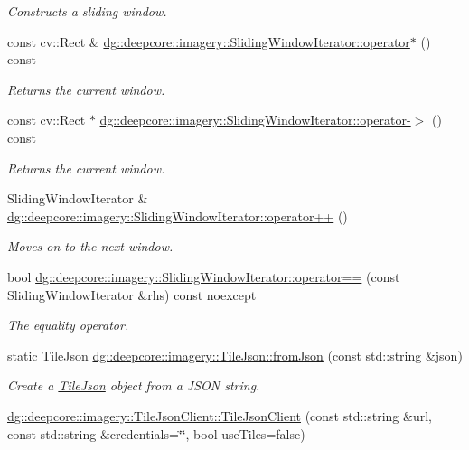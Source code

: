\begin{DoxyCompactItemize}
\begin{DoxyCompactList}\small\item\em Constructs a sliding window. \end{DoxyCompactList}\item 
const cv\+::\+Rect \& \hyperlink{group___imagery_module_gac4ebab49e1019b197708fa07ddf8a550}{dg\+::deepcore\+::imagery\+::\+Sliding\+Window\+Iterator\+::operator$\ast$} () const 
\begin{DoxyCompactList}\small\item\em Returns the current window. \end{DoxyCompactList}\item 
const cv\+::\+Rect $\ast$ \hyperlink{group___imagery_module_ga72f982e7452565b8b39edcfd3e81e2b8}{dg\+::deepcore\+::imagery\+::\+Sliding\+Window\+Iterator\+::operator-\/$>$} () const 
\begin{DoxyCompactList}\small\item\em Returns the current window. \end{DoxyCompactList}\item 
Sliding\+Window\+Iterator \& \hyperlink{group___imagery_module_ga7b899de397aefb4987bcb989f3cb33d4}{dg\+::deepcore\+::imagery\+::\+Sliding\+Window\+Iterator\+::operator++} ()
\begin{DoxyCompactList}\small\item\em Moves on to the next window. \end{DoxyCompactList}\item 
bool \hyperlink{group___imagery_module_gaf2d1d266e7176885e054f28bbdec7c61}{dg\+::deepcore\+::imagery\+::\+Sliding\+Window\+Iterator\+::operator==} (const Sliding\+Window\+Iterator \&rhs) const noexcept
\begin{DoxyCompactList}\small\item\em The equality operator. \end{DoxyCompactList}\item 
static Tile\+Json \hyperlink{group___imagery_module_ga00a8cf6ff58f7d1e46ab5d710efe8e79}{dg\+::deepcore\+::imagery\+::\+Tile\+Json\+::from\+Json} (const std\+::string \&json)
\begin{DoxyCompactList}\small\item\em Create a \hyperlink{structdg_1_1deepcore_1_1imagery_1_1_tile_json}{Tile\+Json} object from a J\+S\+ON string. \end{DoxyCompactList}\item 
\hyperlink{group___imagery_module_ga3a03a27c401542c408a982382e611056}{dg\+::deepcore\+::imagery\+::\+Tile\+Json\+Client\+::\+Tile\+Json\+Client} (const std\+::string \&url, const std\+::string \&credentials=\char`\"{}\char`\"{}, bool use\+Tiles=false)

\end{DoxyCompactItemize}
